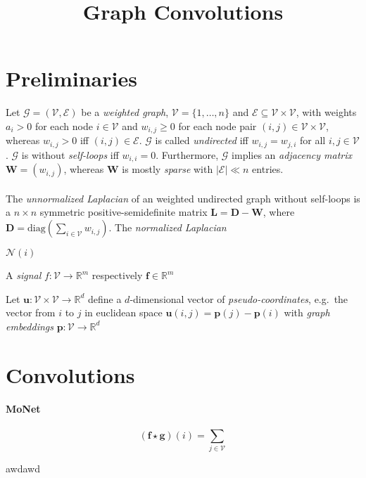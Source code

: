 \documentclass[pdftex,10pt,a4paper]{scrartcl}
\title{Graph Convolutions}
\date{\vspace{-5ex}}
\begin{document}
\maketitle

\section{Preliminaries}

Let $\mathcal{G} = (\mathcal{V}, \mathcal{E})$ be a \emph{weighted graph}, $\mathcal{V} = \{1, \ldots, n\}$ and $\mathcal{E} \subseteq \mathcal{V} \times \mathcal{V}$, with weights $a_i > 0$ for each node $i \in \mathcal{V}$ and $w_{i,j} \geq 0$ for each node pair $(i, j) \in \mathcal{V} \times \mathcal{V}$, whereas $w_{i,j} > 0$ iff $(i, j) \in \mathcal{E}$.
$\mathcal{G}$ is called \emph{undirected} iff $w_{i,j} = w_{j,i}$ for all $i,j \in \mathcal{V}$.
$\mathcal{G}$ is without \emph{self-loops} iff $w_{i,i} = 0$.
Furthermore, $\mathcal{G}$ implies an \emph{adjacency matrix} $\mathbf{W} = \left( w_{i,j} \right)$, whereas $\mathbf{W}$ is mostly \emph{sparse} with $|\mathcal{E}| \ll n$ entries.
\\\\
The \emph{unnormalized Laplacian} of an weighted undirected graph without self-loops is a $n \times n$ symmetric positive-semidefinite matrix $\mathbf{L} = \mathbf{D} - \mathbf{W}$, where $\mathbf{D} = \mathrm{diag}\left( \sum_{i \in \mathcal{V}} w_{i,j}\right)$.
The \emph{normalized Laplacian}

$\mathcal{N}(i)$

A \emph{signal} $f \colon \mathcal{V} \to \mathbb{R}^m$ respectively $\mathbf{f} \in \mathbb{R}^m$

Let $\mathbf{u} \colon \mathcal{V} \times \mathcal{V} \to \mathbb{R}^d$ define a $d$-dimensional vector of \emph{pseudo-coordinates}, e.g.\ the vector from $i$ to $j$ in euclidean space $\mathbf{u}(i,j) = \mathbf{p}(j) - \mathbf{p}(i)$ with \emph{graph embeddings} $\mathbf{p} \colon \mathcal{V} \to \mathbb{R}^d$
\cite{Bronstein2017}

\section{Convolutions}

\paragraph{MoNet}

\begin{equation*}
  (\mathbf{f} \star \mathbf{g})(i) = \sum_{j \in \mathcal{V}}
\end{equation*}


awdawd



\end{document}
